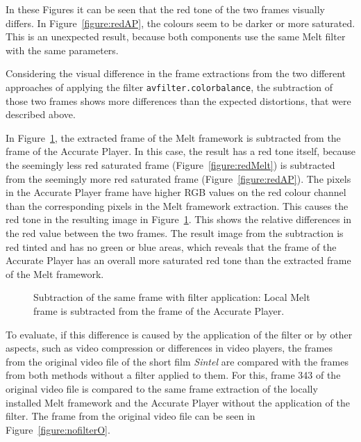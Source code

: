 \documentclass[../MasterThesis.tex]{subfiles}
\begin{document}
\vspace*{1.5em}
In these Figures it can be seen that the red tone of the two frames visually differs. In Figure~\ref{figure:redAP}, the colours seem to be darker or more saturated. This is an unexpected result, because both components use the same Melt filter with the same parameters.


Considering the visual difference in the frame extractions from the two different approaches of applying the filter \texttt{avfilter.colorbalance}, the subtraction of those two frames shows more differences than the expected distortions, that were described above.

In Figure~\ref{figure:filterVSfilter}, the extracted frame of the Melt framework is subtracted from the frame of the Accurate Player.
In this case, the result has a red tone itself, because the seemingly less red saturated frame (Figure~\ref{figure:redMelt}) is subtracted from the seemingly more red saturated frame (Figure~\ref{figure:redAP}). The pixels in the Accurate Player frame have higher RGB values on the red colour channel than the corresponding pixels in the Melt framework extraction. This causes the red tone in the resulting image in Figure~\ref{figure:filterVSfilter}.
This shows the relative differences in the red value between the two frames. 
The result image from the subtraction is red tinted and has no green or blue areas, which reveals that the frame of the Accurate Player has an overall more saturated red tone than the extracted frame of the Melt framework.


\begin{figure}[H]
	\begin{center}
		\caption[Subtraction of the two different frames (Accurate Player - Melt).]{Subtraction of the same frame with filter application: Local Melt frame is subtracted from the frame of the Accurate Player.}
		\label{figure:filterVSfilter}
	\end{center}
\end{figure}

To evaluate, if this difference is caused by the application of the filter or by other aspects, such as video compression or differences in video players, the frames from the original video file of the short film \textit{Sintel} are compared with the frames from both methods without a filter applied to them. For this, frame 343 of the original video file is compared to the same frame extraction of the locally installed Melt framework and the Accurate Player without the application of the filter. The frame from the original video file can be seen in Figure~\ref{figure:nofilterO}.
\end{document}
